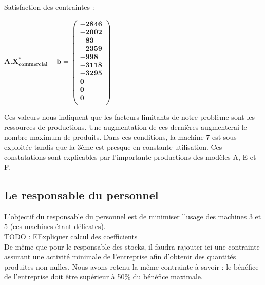 \documentclass[12pt]{article}
\begin{document}
Satisfaction des contraintes : 
\begin{center}
$\mathbf{A.X^{*}_{commercial} - b = 
   \left (
   \begin{array}{c}
      -2846 \\
      -2002 \\
      -83 \\
      -2359 \\
      -998 \\
      -3118 \\
      -3295 \\
      0 \\
      0 \\
      0\\
   \end{array}
   \right )
 } $ 
\end{center}
Ces valeurs nous indiquent que les facteurs limitants de notre problème sont les ressources de productions. Une augmentation de ces dernières augmenterai le nombre maximum de produits.
Dans ces conditions, la machine 7 est sous-exploitée tandis que la 3ème est presque en constante utilisation. Ces constatations sont explicables par l'importante productions des modèles A, E et F. 

\subsection{Le responsable du personnel}
L'objectif du responsable du personnel est de minimiser l'usage des machines 3 et 5 (ces machines étant délicates). 
\\
TODO : EExpliquer calcul des coefficients\\
De même que pour le responsable des stocks, il faudra rajouter ici une contrainte assurant une  activité minimale de l'entreprise afin d'obtenir des quantités produites non nulles. Nous avons retenu la même contrainte à savoir : le bénéfice de l'entreprise doit être supérieur à 50\% du bénéfice maximale.
 
\end{document}
